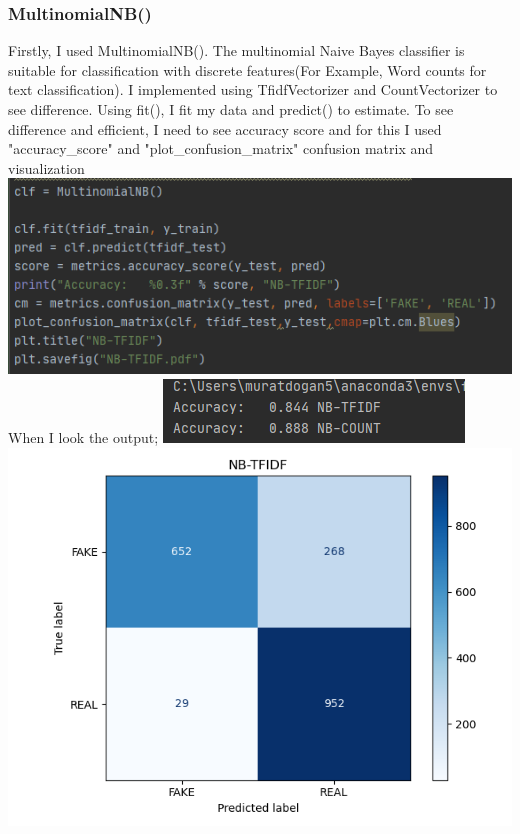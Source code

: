 \documentclass[onecolumn]{article}
\begin{document}
\subsubsection{MultinomialNB()}
Firstly, I used MultinomialNB(). The multinomial Naive Bayes classifier is suitable for classification with discrete features(For Example, Word counts for text classification). I implemented using TfidfVectorizer and CountVectorizer to see difference. Using fit(), I fit my data and predict() to estimate. To see difference and efficient, I need to see accuracy score and for this I used "accuracy\_score" and "plot\_confusion\_matrix" confusion matrix and visualization
\includegraphics[scale=0.7]{fig/6.PNG}\bigskip\newline
\noindent
When I look the output;\newline
\includegraphics[scale=0.7]{fig/7.PNG}\newline
\includegraphics[scale=0.3]{fig/8.PNG}
\end{document}
